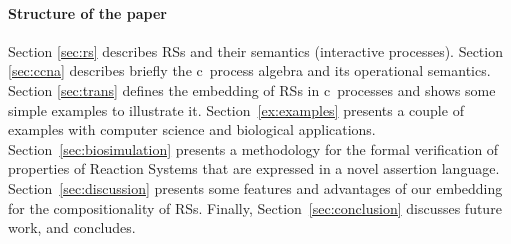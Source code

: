 \paragraph{Structure of the paper} 

Section \ref{sec:rs} 
describes RSs and their semantics (interactive processes).
Section \ref{sec:ccna} describes briefly the c\CNA \ process algebra and
its operational semantics.
Section \ref{sec:trans} defines the embedding of RSs in
c\CNA \ processes and shows some simple examples to illustrate 
it.
Section~\ref{ex:examples} presents a couple of examples with computer science and biological applications.
Section~\ref{sec:biosimulation} presents a methodology for the formal verification of
properties of Reaction Systems that are expressed in a novel assertion language.
Section~\ref{sec:discussion} presents some features and 
advantages of our embedding for the compositionality of RSs.
Finally, Section~\ref{sec:conclusion}
discusses future work, and concludes.


